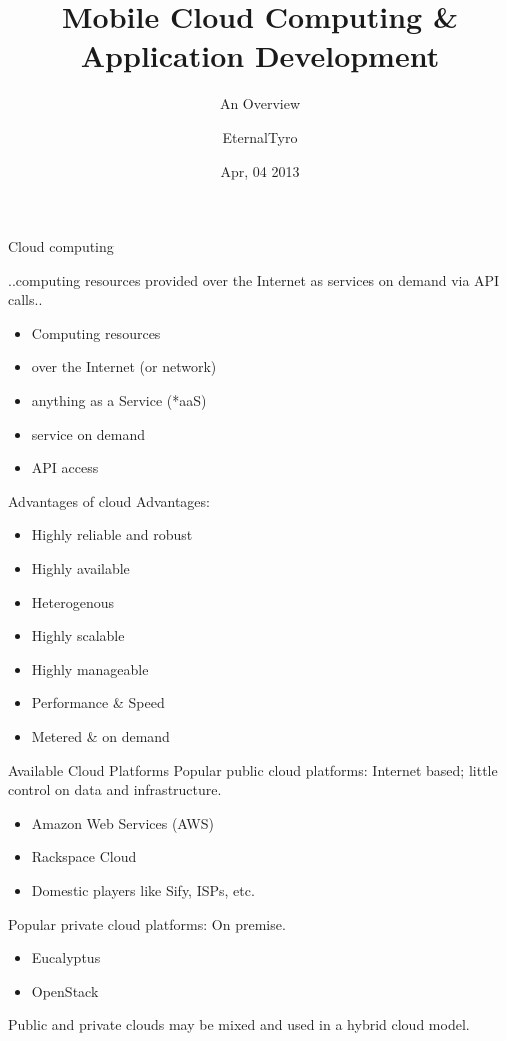 \documentclass{beamer}
\title[Mobile Cloud Computing]{Mobile Cloud Computing \& Application Development}
\subtitle[Overview]{An Overview}
\author[EternalTyro]{EternalTyro}
\institute[The Internet]{
      Dummy Company\\
      Big City..\\[1ex]
      \texttt{blank@blank.com}
}
\date{Apr, 04 2013}
\begin{document}
\begin{frame}[plain]
  \titlepage
\end{frame}

\begin{frame}{Cloud computing}

\begin{definition}
 ..computing resources provided over the Internet as services on demand via API calls..
\end{definition}
\pause

\begin{itemize}
 \item Computing resources
 \pause
 \item over the Internet (or network)
 \pause
 \item anything as a Service (*aaS)
 \pause
 \item service on demand
 \pause
 \item API access
\end{itemize}
\end{frame}

\begin{frame}{Advantages of cloud}
Advantages:
\begin{itemize}
 \item Highly reliable and robust
 \pause
 \item Highly available
 \pause
 \item Heterogenous
 \pause
 \item Highly scalable
 \pause
 \item Highly manageable
 \pause
 \item Performance \& Speed
 \pause
 \item Metered \& on demand
\end{itemize}
\end{frame}


\begin{frame}{Available Cloud Platforms}
Popular public cloud platforms: Internet based; little control on data and infrastructure.
\begin{itemize}
 \item Amazon Web Services (AWS)
 \item Rackspace Cloud
 \item Domestic players like Sify, ISPs, etc.
\end{itemize}
\pause
Popular private cloud platforms: On premise.
\begin{itemize}
 \item Eucalyptus
 \item OpenStack
\end{itemize}
\pause
Public and private clouds may be mixed and used in a hybrid cloud model.
\end{frame}
\end{document}
